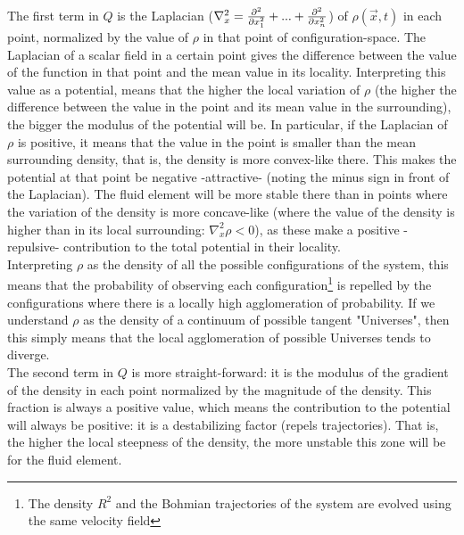 \documentclass[11pt, a4paper]{article} %
\DeclareRobustCommand{\mybox}[2][gray!10]{%
\begin{tcolorbox}[   %
        left=0.2cm,
        right=0.2cm,
        top=0.15cm,
        bottom=0.15cm,
        colback=#1,
        colframe=#1,
        width=\dimexpr\textwidth\relax, 
        enlarge left by=0mm,
        boxsep=5pt,
        arc=0pt,outer arc=0pt,
        ]
        #2
\end{tcolorbox}
}
\begin{document}
\mybox{
The first term in $Q$ is the Laplacian ($\nabla_x^2 = \pdv[2]{}{x_1}+...+\pdv[2]{}{x_n}$) of $\rho(\vec{x},t)$ in each point, normalized by the value of $\rho$ in that point of configuration-space. The Laplacian of a scalar field in a certain point gives the difference between the value of the function in that point and the mean value in its locality. Interpreting this value as a potential, means that the higher the local variation of $\rho$ (the higher the difference between the value in the point and its mean value in the surrounding), the bigger the modulus of the potential will be. In particular, if the Laplacian of $\rho$ is positive, it means that the value in the point is smaller than the mean surrounding density, that is, the density is more convex-like there. This makes the potential at that point be negative -attractive- (noting the minus sign in front of the Laplacian). The fluid element will be more stable there than in points where the variation of the density is more concave-like (where the value of the density is higher than in its local surrounding: $\nabla_x^2 \rho<0$), as these make a positive -repulsive- contribution to the total potential in their locality.\\

Interpreting $\rho$ as the density of all the possible configurations of the system, this means that the probability of observing each configuration\footnote{ The density $R^2$ and the Bohmian trajectories of the system are evolved using the same velocity field} is repelled by the configurations where there is a locally high agglomeration of probability. If we understand $\rho$ as the density of a continuum of possible tangent "Universes", then this simply means that the local agglomeration of possible Universes tends to diverge.\\

The second term in $Q$ is more straight-forward: it is the modulus of the gradient of the density in each point normalized by the magnitude of the density. This fraction is always a positive value, which means the contribution to the potential will always be positive: it is a destabilizing factor (repels trajectories). That is, the higher the local steepness of the density, the more unstable this zone will be for the fluid element.
}
\end{document}
